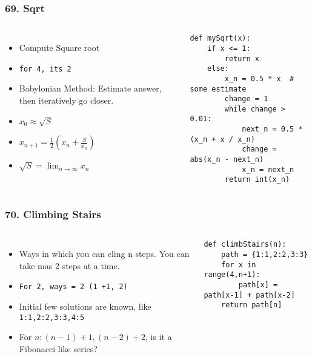 \begin{frame}[fragile]\frametitle{69. Sqrt}

	\begin{columns}[T]
	\begin{itemize}
	\item Compute Square root
	\item \lstinline{for 4, its 2}
	\item Babylonian Method: Estimate answer, then iteratively go closer.
	\item $x_0 \approx \sqrt{S}$
	\item $x_{n+1} = \frac{1}{2}(x_n + \frac{S}{x_n})$
	\item $\sqrt{S} = \lim_{n \rightarrow \infty} x_n$
	\end{itemize}
		\begin{lstlisting}[basicstyle=\scriptsize]
def mySqrt(x):
    if x <= 1:
        return x
    else:
        x_n = 0.5 * x  # some estimate
        change = 1
        while change > 0.01:
            next_n = 0.5 * (x_n + x / x_n)
            change = abs(x_n - next_n)
            x_n = next_n
        return int(x_n)

				\end{lstlisting}		

	\end{columns}
		
\end{frame}

\begin{frame}[fragile]\frametitle{70. Climbing Stairs}

	\begin{columns}[T]
	\begin{itemize}
	\item Ways in which you can cling n steps. You can take mas 2 steps at a time.
	\item \lstinline{For 2, ways = 2 (1 +1, 2)}
	\item Initial few solutions are known, like \lstinline{1:1,2:2,3:3,4:5}
	\item For $n: (n-1) + 1, (n -2 ) + 2$, is it a Fibonacci like series?
	\end{itemize}
		\begin{lstlisting}[basicstyle=\scriptsize]
def climbStairs(n):
    path = {1:1,2:2,3:3}
    for x in range(4,n+1):
        path[x] = path[x-1] + path[x-2]
    return path[n]
				\end{lstlisting}		

	\end{columns}
		
\end{frame}

